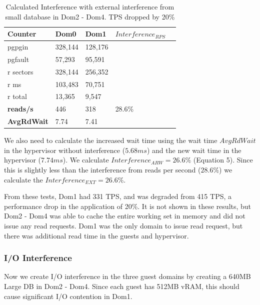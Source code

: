\begin{table}[h]
\begin{tabular}{ l l l l p{5cm} }
  Counter & Dom0 & Dom1 & $Interference_{RPS}$ \\
  \hline
	pgpgin    & 328,144 & 128,176 &  \\
	pgfault   &  57,293 &  95,591 &  \\
	r sectors & 328,144 & 256,352 &  \\
	r ms      & 103,483 &  70,751 &  \\
	r total   &  13,365 &   9,547 &  \\
    \textbf{reads/s}    & 446 & 318 & 28.6\%  \\
    \textbf{AvgRdWait}  & 7.74 & 7.41 & \\ 
  \hline
\end{tabular}
\caption{Calculated Interference with external interference from small database in Dom2 - Dom4.  TPS dropped by 20\%} 
\label{fig:InterferenceSm}
\end{table}
We also need to calculate the increased wait time using the wait time $AvgRdWait$ in the hypervisor without interference ($5.68 ms$) and the new wait time in the hypervisor ($7.74 ms$). We calculate $Interference_{ARW} = 26.6\%$ (Equation 5).  Since this is slightly less than the interference from reads per second ($28.6\%$) we calculate the $Interference_{EXT} = 26.6\%$.

From these tests, Dom1 had 331 TPS, and was degraded from 415 TPS, a performance drop in the application of 20\%.  It is not shown in these results, but Dom2 - Dom4 was able to cache the entire working set in memory and did not issue any read requests.  Dom1 was the only domain to issue read request, but there was additional read time in the guests and hypervisor. 

\subsubsection{I/O Interference}
Now we create I/O interference in the three guest domains by creating a 640MB Large DB in Dom2 - Dom4.  Since each guest has 512MB vRAM, this should cause significant I/O contention in Dom1.

